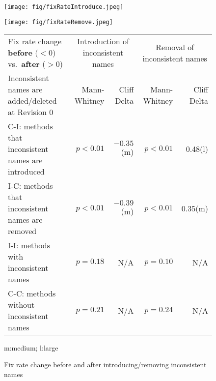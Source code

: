 


\begin{figure*}[!htb]
    \begin{minipage}{0.49\textwidth}
     \centering
 \texttt{[image: fig/fixRateIntroduce.jpeg]}   
%       
  \end{minipage}
  \hfill
     \begin{minipage}{0.49\textwidth}
     \centering
 \texttt{[image: fig/fixRateRemove.jpeg]}  
%      
    \end{minipage}
      
      \begin{minipage}{1\textwidth}
           \centering
           \scriptsize{
 \begin{tabular}{l|rr|rr} 
 {Fix rate change {\bf before} ($<0$) vs.~{\bf after} ($>0$)}&  \multicolumn{2}{c|}{Introduction of inconsistent names} & \multicolumn{2}{c}{Removal of inconsistent names}\\
Inconsistent names are added/deleted at Revision 0& Mann-Whitney&Cliff Delta& Mann-Whitney&Cliff Delta\\ \midrule
C-I: methods that inconsistent names are introduced&$p<0.01$&$-0.35$(m)&$p<0.01$&0.48(l)\\ 
I-C: methods that inconsistent names are removed&$p<0.01$&$-0.39$(m)&$p<0.01$&0.35(m)\\ 
I-I: methods with inconsistent names&$p=0.18$&N/A&$p=0.10$&N/A\\ 
C-C: methods without inconsistent names&$p=0.21$&N/A&$p=0.24$&N/A\\ 
 \end{tabular}
 
 m:medium;  l:large
 }
    \end{minipage}
       \vspace{-3mm}
     \caption{Fix rate change before and after introducing/removing inconsistent names}
   \label{fig:rateChange}
      \vspace{-3mm}
\end{figure*}

